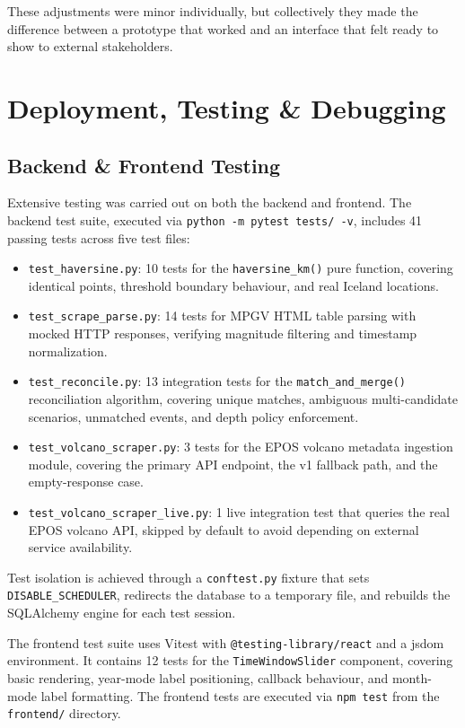 \documentclass[12pt]{article}
\begin{document}
These adjustments were minor individually, but collectively they made the difference between a prototype that worked and an interface that felt ready to show to external stakeholders.

\newpage

\section{Deployment, Testing \& Debugging}
\subsection{Backend \& Frontend Testing}
Extensive testing was carried out on both the backend and frontend. The backend test suite, executed via \texttt{python -m pytest tests/ -v}, includes 41 passing tests across five test files:

\begin{itemize}
    \item \texttt{test\_haversine.py}: 10 tests for the \texttt{haversine\_km()} pure function, covering identical points, threshold boundary behaviour, and real Iceland locations.
    \item \texttt{test\_scrape\_parse.py}: 14 tests for MPGV HTML table parsing with mocked HTTP responses, verifying magnitude filtering and timestamp normalization.
    \item \texttt{test\_reconcile.py}: 13 integration tests for the \texttt{match\_and\_merge()} reconciliation algorithm, covering unique matches, ambiguous multi-candidate scenarios, unmatched events, and depth policy enforcement.
    \item \texttt{test\_volcano\_scraper.py}: 3 tests for the EPOS volcano metadata ingestion module, covering the primary API endpoint, the v1 fallback path, and the empty-response case.
    \item \texttt{test\_volcano\_scraper\_live.py}: 1 live integration test that queries the real EPOS volcano API, skipped by default to avoid depending on external service availability.
\end{itemize}

Test isolation is achieved through a \texttt{conftest.py} fixture that sets \texttt{DISABLE\_SCHEDULER}, redirects the database to a temporary file, and rebuilds the SQLAlchemy engine for each test session.

The frontend test suite uses Vitest with \texttt{@testing-library/react} and a jsdom environment. It contains 12 tests for the \texttt{TimeWindowSlider} component, covering basic rendering, year-mode label positioning, callback behaviour, and month-mode label formatting. The frontend tests are executed via \texttt{npm test} from the \texttt{frontend/} directory.
\end{document}
